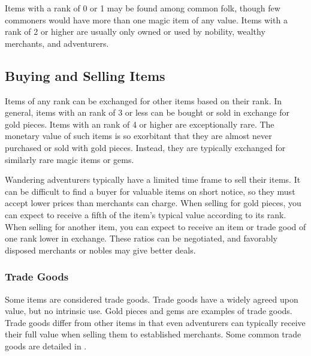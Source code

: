     Items with a rank of 0 or 1 may be found among common folk, though few commoners would have more than one magic item of any value.
    Items with a rank of 2 or higher are usually only owned or used by nobility, wealthy merchants, and adventurers.

  \subsection{Buying and Selling Items}
    Items of any rank can be exchanged for other items based on their rank.
    In general, items with an rank of 3 or less can be bought or sold in exchange for gold pieces.
    Items with an rank of 4 or higher are exceptionally rare.
    The monetary value of such items is so exorbitant that they are almost never purchased or sold with gold pieces.
    Instead, they are typically exchanged for similarly rare magic items or gems.

    Wandering adventurers typically have a limited time frame to sell their items.
    It can be difficult to find a buyer for valuable items on short notice, so they must accept lower prices than merchants can charge.
    When selling for gold pieces, you can expect to receive a fifth of the item's typical value according to its rank.
    When selling for another item, you can expect to receive an item or trade good of one rank lower in exchange.
    These ratios can be negotiated, and favorably disposed merchants or nobles may give better deals.

    \subsubsection{Trade Goods}
      Some items are considered trade goods.
      Trade goods have a widely agreed upon value, but no intrinsic use.
      Gold pieces and gems are examples of trade goods.
      Trade goods differ from other items in that even adventurers can typically receive their full value when selling them to established merchants.
      Some common trade goods are detailed in .

